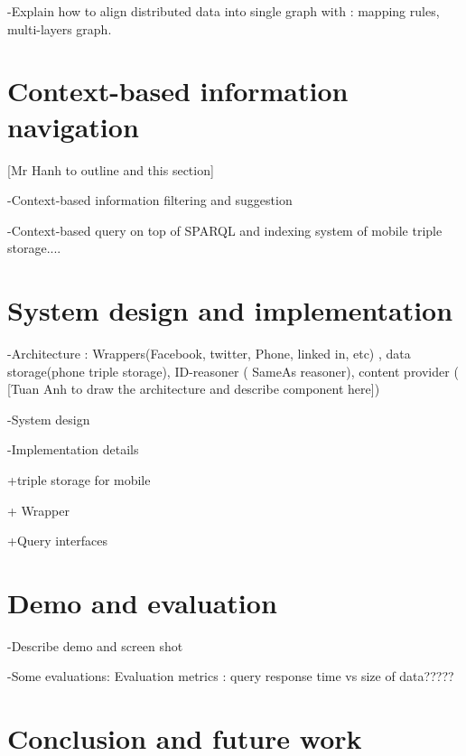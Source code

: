 \documentclass[runningheads,a4paper]{llncs}
\begin{document}
-Explain how to align distributed data into single graph with : mapping rules, multi-layers graph.
 

\section{Context-based information navigation}

[Mr Hanh to outline and  this section]
 
-Context-based information filtering and suggestion

-Context-based query on top of SPARQL and indexing system of mobile triple storage....

\section{System design and implementation}

-Architecture : Wrappers(Facebook, twitter, Phone, linked in, etc) , data storage(phone triple storage), 
ID-reasoner ( SameAs reasoner), content provider ( [Tuan Anh to draw the architecture and describe 
component here])

-System design

-Implementation details
	
	+triple storage for mobile
	
	+ Wrapper
	
	+Query interfaces 

\section{Demo and evaluation}

-Describe demo and screen shot

-Some evaluations: Evaluation metrics : query response time vs size of data?????

\section{Conclusion and future work}

%


\end{document}
